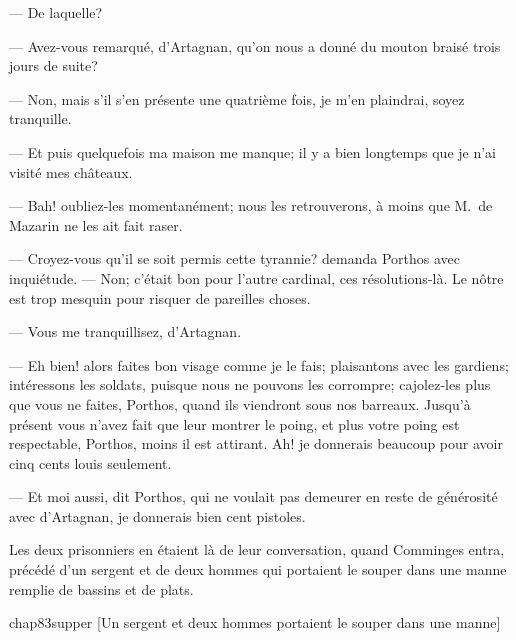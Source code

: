 — De laquelle?

— Avez-vous remarqué, d'Artagnan, qu'on nous a donné du mouton braisé trois jours de suite?

— Non, mais s'il s'en présente une quatrième fois, je m'en plaindrai, soyez tranquille.

— Et puis quelquefois ma maison me manque; il y a bien longtemps que je n'ai visité mes châteaux.

— Bah! oubliez-les momentanément; nous les retrouverons, à moins que M.~de Mazarin ne les ait fait raser.

— Croyez-vous qu'il se soit permis cette tyrannie? demanda Porthos avec inquiétude.
— Non; c'était bon pour l'autre cardinal, ces résolutions-là. Le nôtre est trop mesquin pour risquer de pareilles choses.

— Vous me tranquillisez, d'Artagnan.

— Eh bien! alors faites bon visage comme je le fais; plaisantons avec les gardiens; intéressons les soldats, puisque nous ne pouvons les corrompre; cajolez-les plus que vous ne faites, Porthos, quand ils viendront sous nos barreaux. Jusqu'à présent vous n'avez fait que leur montrer le poing, et plus votre poing est respectable, Porthos, moins il est attirant. Ah! je donnerais beaucoup pour avoir cinq cents louis seulement.

— Et moi aussi, dit Porthos, qui ne voulait pas demeurer en reste de générosité avec d'Artagnan, je donnerais bien cent pistoles.

Les deux prisonniers en étaient là de leur conversation, quand Comminges entra, précédé d'un sergent et de deux hommes qui portaient le souper dans une manne remplie de bassins et de plats.

\begin{bwbigpic}
	[\basicscale] 
	{chap83supper}
	[Un sergent et deux hommes portaient le souper dans une manne]
\end{bwbigpic}